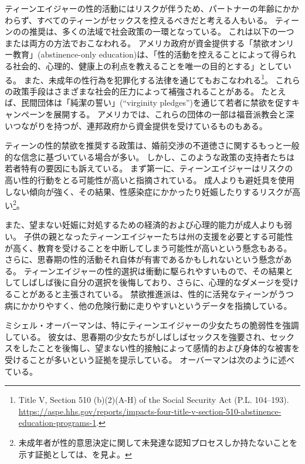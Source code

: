 \documentclass[paper=a4,book,openany]{jlreq}
\begin{document}
ティーンエイジャーの性的活動にはリスクが伴うため、パートナーの年齢にかかわらず、すべてのティーンがセックスを控えるべきだと考える人もいる。
ティーンのの推奨は、多くの法域で社会政策の一環となっている。
これは以下の一つまたは両方の方法でおこなわれる。
アメリカ政府が資金提供する「禁欲オンリー教育」(abstinence-only education)は、「性的活動を控えることによって得られる社会的、心理的、健康上の利点を教えることを唯一の目的とする」としている。
また、未成年の性行為を犯罪化する法律を通じてもおこなわれる\footnote{Title V, Section 510 (b)(2)(A-H) of the Social Security Act (P.L. 104--193). \url{https://aspe.hhs.gov/reports/impacts-four-title-v-section-510-abstinence-education-programs-1}.}。
これらの政策手段はさまざまな社会的圧力によって補強されることがある。
たとえば、民間団体は「純潔の誓い」(``virginity pledges'')を通じて若者に禁欲を促すキャンペーンを展開する。
アメリカでは、これらの団体の一部は福音派教会と深いつながりを持つが、連邦政府から資金提供を受けているものもある。

ティーンの性的禁欲を推奨する政策は、婚前交渉の不道徳さに関するもっと一般的な信念に基づいている場合が多い。
しかし、このような政策の支持者たちは若者特有の要因にも訴えている。
まず第一に、ティーンエイジャーはリスクの高い性的行動をとる可能性が高いと指摘されている。
成人よりも避妊具を使用しない傾向が強く、その結果、性感染症にかかったり妊娠したりするリスクが高い\footnote{未成年者が性的意思決定に関して未発達な認知プロセスしか持たないことを示す証拠としては、\citet{drobac14:_neurob_decis_makin_high_risk}を見よ。
}。

また、望まない妊娠に対処するための経済的および心理的能力が成人よりも弱い。
子供の親となったティーンエイジャーたちは州の支援を必要とする可能性が高く、教育を受けることを中断してしまう可能性が高いという懸念もある。
さらに、思春期の性的活動それ自体が有害であるかもしれないという懸念がある。
ティーンエイジャーの性的選択は衝動に駆られやすいもので、その結果としてしばしば後に自分の選択を後悔しており、さらに、心理的なダメージを受けることがあると主張されている。
禁欲推進派は、性的に活発なティーンがうつ病にかかりやすく、他の危険行動に走りやすいというデータを指摘している\citep[pp.163--170]{hallfors05:_which_comes_first_adoles}。

ミシェル・オーバーマンは、特にティーンエイジャーの少女たちの脆弱性を強調している。
彼女は、思春期の少女たちがしばしばセックスを強要され、セックスをしたことを後悔し、望まない性的接触によって感情的および身体的な被害を受けることが多いという証拠を提示している。
オーバーマンは次のように述べている。
\end{document}
